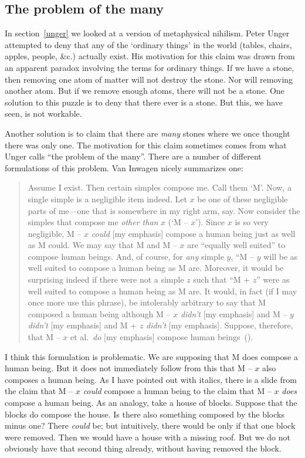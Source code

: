 \documentclass[11pt]{standalone} \newif\ifstandlone \standalonetrue
\newenvironment{squote}{%
	\begin{quote}\begin{singlespace}%
	}{%
	\end{singlespace}\end{quote}}
\begin{document}
\begin{spacing}{1.5}
\section{The problem of the many}
\label{many}
In section~\ref{unger} we looked at a version of metaphysical
nihilism.  Peter Unger attempted to deny that any of the `ordinary
things' in the world (tables, chairs, apples, people, \&c.) actually
exist.  His motivation for this claim was drawn from an apparent
paradox involving the terms for ordinary things.  If we have a stone,
then removing one atom of matter will not destroy the stone.  Nor will
removing another atom.  But if we remove enough atoms, there will not
be a stone.  One solution to this puzzle is to deny that there ever is
a stone.  But this, we have seen, is not workable.

Another solution is to claim that there are {\em many} stones where we
once thought there was only one.  The motivation for this claim
sometimes comes from what Unger calls ``the problem of the many''.
There are a number of different formulations of this problem.  Van
Inwagen nicely summarizes one:
\begin{squote}
Assume I exist.  Then certain simples compose me.  Call them `M'.
Now, a single simple is a negligible item indeed.  Let $x$ be one of
these negligible parts of me---one that is somewhere in my right arm,
say.  Now consider the simples that compose me {\em other than} $x$
(`M -- $x$').  Since $x$ is so very negligible, M -- $x$ {\em could}
[my emphasis] compose a human being just as well as M could.  We may
say that M and M -- $x$ are ``equally well suited'' to compose human
beings.  And, of course, for {\em any} simple $y$, ``M -- $y$ will be
as well suited to compose a human being as M are.  Moreover, it would
be surprising indeed if there were not a simple $z$ such that ``M +
$z$'' were as well suited to compose a human being as M are.  It
would, in fact (if I may once more use this phrase), be intolerably
arbitrary to say that M composed a human being although M -- $x$ {\em
  didn't} [my emphasis] and M -- $y$ {\em didn't} [my emphasis] and M
+ $z$ {\em didn't} [my emphasis].  Suppose, therefore, that M -- $x$
et al.\ {\em do} [my emphasis] compose human
beings~(\citeyear[215]{inwagen1995}).
\end{squote}

I think this formulation is problematic.  We are supposing that M does
compose a human being.  But it does not immediately follow from this
that M -- $x$ also composes a human being.  As I have pointed out with
italics, there is a slide from the claim that M -- $x$ {\em could}
compose a human being to the claim that M -- $x$ {\em does} compose a
human being.  As an analogy, take a house of blocks.  Suppose that the
blocks do compose the house.  Is there also something composed by the
blocks minus one? There {\em could} be; but intuitively, there would
be only if that one block were removed.  Then we would have a house
with a missing roof.  But we do not obviously have that second thing
already, without having removed the block.


\end{spacing}
\end{document}
